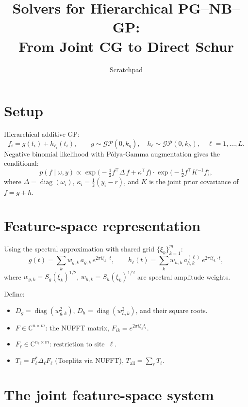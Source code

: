 \documentclass[11pt]{article}
\title{Solvers for Hierarchical PG--NB--GP:\\
  From Joint CG to Direct Schur}
\author{Scratchpad}
\date{}
\newcommand{\C}{\mathbb{C}}
\newcommand{\diag}{\operatorname{diag}}
\begin{document}
\maketitle

\section{Setup}

Hierarchical additive GP:
\[
  f_i = g(t_i) + h_{\ell_i}(t_i), \qquad
  g \sim \mathcal{GP}(0, k_g), \quad
  h_\ell \sim \mathcal{GP}(0, k_h), \quad \ell = 1,\dots,L.
\]
Negative binomial likelihood with P\'olya-Gamma augmentation gives the
conditional:
\[
  p(f \mid \omega, y) \propto \exp\!\bigl(-\tfrac12 f^\top \Delta\, f
  + \kappa^\top f\bigr)
  \cdot \exp\!\bigl(-\tfrac12 f^\top K^{-1} f\bigr),
\]
where $\Delta = \diag(\omega_i)$, $\kappa_i = \tfrac12(y_i - r)$,
and $K$ is the joint prior covariance of $f = g + h$.

\section{Feature-space representation}

Using the spectral approximation with shared grid $\{\xi_k\}_{k=1}^m$:
\[
  g(t) = \sum_k w_{g,k}\, a_{g,k}\, e^{2\pi i \xi_k \cdot t},
  \qquad
  h_\ell(t) = \sum_k w_{h,k}\, a_{h,k}^{(\ell)}\, e^{2\pi i \xi_k \cdot t},
\]
where $w_{g,k} = S_g(\xi_k)^{1/2}$, $w_{h,k} = S_h(\xi_k)^{1/2}$
are spectral amplitude weights.

Define:
\begin{itemize}
\item $D_g = \diag(w_{g,k}^2)$, \; $D_h = \diag(w_{h,k}^2)$,
  \; and their square roots.
\item $F \in \C^{n \times m}$: the NUFFT matrix, $F_{ik} = e^{2\pi i \xi_k t_i}$.
\item $F_\ell \in \C^{n_\ell \times m}$: restriction to site~$\ell$.
\item $T_\ell = F_\ell^* \Delta_\ell F_\ell$ (Toeplitz via NUFFT),
  \; $T_{\mathrm{all}} = \sum_\ell T_\ell$.
\end{itemize}

\section{The joint feature-space system}
\end{document}
